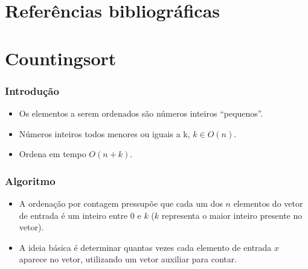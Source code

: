 \documentclass[aspectratio=169]{beamer}
\begin{document}

\section{Referências bibliográficas}

\section{Countingsort} %

\begin{frame}
\frametitle{Introdução}
\begin{itemize}
\item Os elementos a serem ordenados são números inteiros ``pequenos''.
\item Números inteiros todos menores ou iguais a k, $k \in O(n)$.
\item Ordena em tempo $O(n+k)$.
\end{itemize}
\end{frame}

\begin{frame}
\frametitle{Algoritmo}
\begin{itemize}
\item A ordenação por contagem pressupõe que cada um dos $n$ elementos do vetor de entrada é um inteiro entre 0 e $k$ ($k$ representa o maior inteiro presente no vetor).
\item A ideia básica é determinar quantas vezes cada elemento de entrada $x$ aparece no vetor, utilizando um vetor auxiliar para contar.
\end{itemize}
\end{frame}
\end{document}
